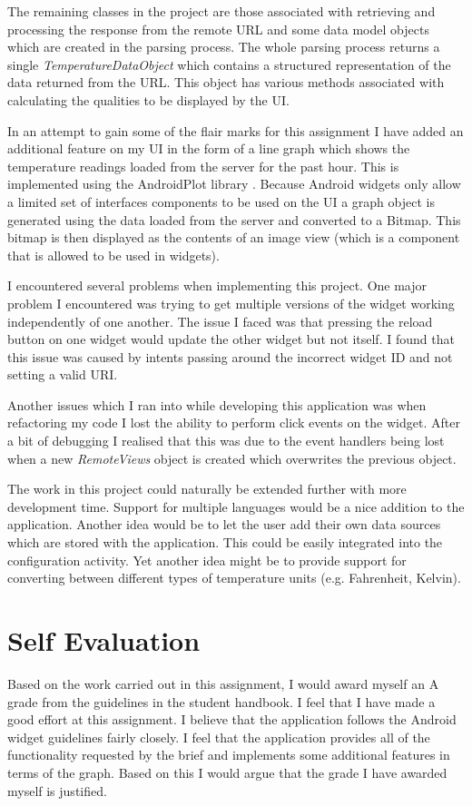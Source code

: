 \documentclass[paper=a4, fontsize=11pt]{scrartcl}	%
\numberwithin{equation}{section}															%
\numberwithin{figure}{section}																%
\numberwithin{table}{section}
\begin{document}
The remaining classes in the project are those associated with retrieving and processing the response from the remote URL and some data model objects which are created in the parsing process. The whole parsing process returns a single \textit{TemperatureDataObject} which contains a structured representation of the data returned from the URL. This object has various methods associated with calculating the qualities to be displayed by the UI. 

In an attempt to gain some of the flair marks for this assignment I have added an additional feature on my UI in the form of a line graph which shows the temperature readings loaded from the server for the past hour. This is implemented using the AndroidPlot library \cite{android-plot}. Because Android widgets only allow a limited set of interfaces components to be used on the UI a graph object is generated using the data loaded from the server and converted to a Bitmap. This bitmap is then displayed as the contents of an image view (which is a component that is allowed to be used in widgets). 

I encountered several problems when implementing this project. One major problem I encountered was trying to get multiple versions of the widget working independently of one another. The issue I faced was that pressing the reload button on one widget would update the other widget but not itself. I found that this issue was caused by intents passing around the incorrect widget ID and not setting a valid URI.

Another issues which I ran into while developing this application was when refactoring my code I lost the ability to perform click events on the widget. After a bit of debugging I realised that this was due to the event handlers being lost when a new \textit{RemoteViews} object is created which overwrites the previous object.

The work in this project could naturally be extended further with more development time. Support for multiple languages would be a nice addition to the application. Another idea would be to let the user add their own data sources which are stored with the application. This could be easily integrated into the configuration activity. Yet another idea might be to provide support for converting between different types of temperature units (e.g. Fahrenheit, Kelvin).

\section{Self Evaluation}
Based on the work carried out in this assignment, I would award myself an A grade from the guidelines in the student handbook. I feel that I have made a good effort at this assignment. I believe that the application follows the Android widget guidelines fairly closely. I feel that the application provides all of the functionality requested by the brief and implements some additional features in terms of the graph. Based on this I would argue that the grade I have awarded myself is justified.
\end{document}
